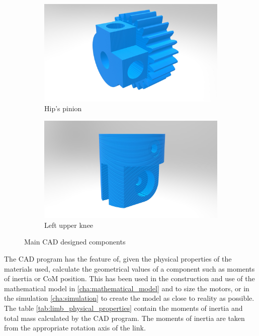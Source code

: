 \begin{figure}[ht!]
    \ContinuedFloat %
    \begin{subfigure}[b]{0.49\textwidth}
        \includegraphics[width=\textwidth]{figures/legs_hip_pinion.jpg}
        \caption{Hip's pinion}
        \label{fig:hip_pinion}
    \end{subfigure}
    \begin{subfigure}[b]{0.49\textwidth}
        \includegraphics[width=\textwidth]{figures/legs_knee_upper.jpg}
        \caption{Left upper knee}
        \label{fig:knee_upper}
    \end{subfigure}
    \caption{Main CAD designed components}
\end{figure}

The CAD program has the feature of, given the physical properties of the materials used, calculate the geometrical values of a component such as moments of inertia or CoM position.
This has been used in the construction and use of the mathematical model in \ref{cha:mathematical_model} and to size the motors, or in the simulation \ref{cha:simulation} to create the model as close to reality as possible.
The table \ref{tab:limb_physical_properties} contain the moments of inertia and total mass calculated by the CAD program.
The moments of inertia are taken from the appropriate rotation axis of the link.


